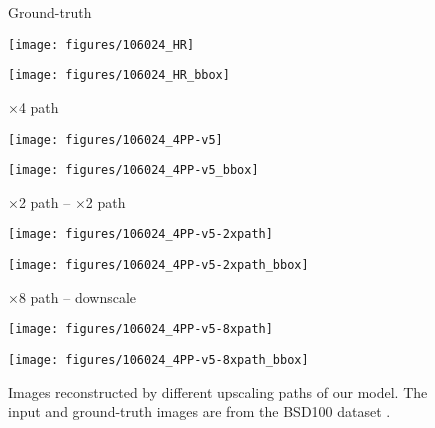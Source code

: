 \documentclass[runningheads]{llncs}
\begin{document}
\begin{figure*}[t!]
	\centering
	\begin{minipage}[b]{0.23\linewidth}
		\centering
		\centerline{\scriptsize{Ground-truth}}\medskip
		\centerline{\texttt{[image: figures/106024\_HR]}}\smallskip
		\centerline{\texttt{[image: figures/106024\_HR\_bbox]}}
	\end{minipage}
	\begin{minipage}[b]{0.23\linewidth}
		\centering
		\centerline{\scriptsize{$\times$4 path}}\medskip
		\centerline{\texttt{[image: figures/106024\_4PP-v5]}}\smallskip
		\centerline{\texttt{[image: figures/106024\_4PP-v5\_bbox]}}
	\end{minipage}
	\begin{minipage}[b]{0.23\linewidth}
		\centering
		\centerline{\scriptsize{$\times$2 path -- $\times$2 path}}\medskip
		\centerline{\texttt{[image: figures/106024\_4PP-v5-2xpath]}}\smallskip
		\centerline{\texttt{[image: figures/106024\_4PP-v5-2xpath\_bbox]}}
	\end{minipage}
	\begin{minipage}[b]{0.23\linewidth}
		\centering
		\centerline{\scriptsize{$\times$8 path -- downscale}}\medskip
		\centerline{\texttt{[image: figures/106024\_4PP-v5-8xpath]}}\smallskip
		\centerline{\texttt{[image: figures/106024\_4PP-v5-8xpath\_bbox]}}
	\end{minipage}
	\caption{Images reconstructed by different upscaling paths of our model. The input and ground-truth images are from the BSD100 dataset \cite{martin2001database}.}
	\label{fig:result_upscale_path_comparison}
\end{figure*}
\end{document}
